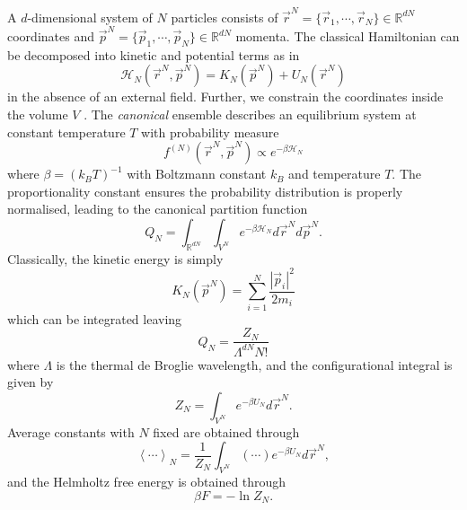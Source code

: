 A $d$-dimensional system of $N$ particles consists of $\vec{r}^N = \{\vec{r}_1, \cdots, \vec{r}_N\} \in \mathbb{R}^{dN}$ coordinates and $\vec{p}^N = \{\vec{p}_1, \cdots, \vec{p}_N\} \in \mathbb{R}^{dN}$ momenta.
The classical Hamiltonian can be decomposed into kinetic and potential terms as in
\begin{equation}
  \mathcal{H}_N(\vec{r}^N, \vec{p}^N)
  =
  K_N(\vec{p}^N) + U_N(\vec{r}^N)
\end{equation}
in the absence of an external field.
Further, we constrain the coordinates inside the volume $V$%
.
The \emph{canonical} ensemble describes an equilibrium system at constant temperature $T$ with probability measure
\begin{equation}
  f^{(N)}(\vec{r}^N, \vec{p}^N) \propto e^{-\beta \mathcal{H}_N}
\end{equation}
where $\beta = (k_B T)^{-1}$ with Boltzmann constant $k_B$ and temperature $T$.
The proportionality constant ensures the probability distribution is properly normalised, leading to the canonical partition function
\begin{equation}
  Q_N
  =
  \int_{\mathbb{R}^{dN}} \int_{V^N}
  e^{-\beta\mathcal{H}_N}
  d\vec{r}^N d\vec{p}^N.
\end{equation}
Classically, the kinetic energy is simply
\begin{equation*}
  K_N(\vec{p}^N) = \sum_{i=1}^N \frac{|\vec{p}_i|^2}{2m_i}
\end{equation*}
which can be integrated leaving
\begin{equation}
  Q_N = \frac{Z_N}{\Lambda^{dN} N!}
\end{equation}
where $\Lambda$ is the thermal de Broglie wavelength, and the configurational integral is given by
\begin{equation}\label{eq:canonical-partition}
  Z_N
  =
  \int_{V^N}
  e^{-\beta U_N}
  d\vec{r}^N.
\end{equation}
Average constants with $N$ fixed are obtained through
\begin{equation*}\label{eq:canonical-average}
  \left< \cdots \right>_N
  =
  \frac{1}{Z_N}
  \int_{V^N} \left(\cdots\right) e^{-\beta U_N} d\vec{r}^N,
\end{equation*}
and the Helmholtz free energy is obtained through
\begin{equation*}
  \beta F = -\ln{Z_N}.
\end{equation*}

